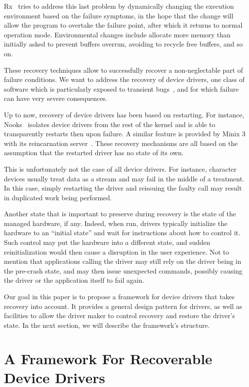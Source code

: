 \documentclass{acm_proc_article-sp}
\begin{document}
Rx~\cite{Qin2007} tries to address this last problem by dynamically changing the execution environment based on the failure symptoms, in the hope that the change will allow the program to overtake the failure point, after which it returns to normal operation mode. Environmental changes include allocate more memory than initially asked to prevent buffers overrun, avoiding to recycle free buffers, and so on.

These recovery techniques allow to successfully recover a non-neglectable part of failure conditions. We want to address the recovery of device drivers, one class of software which is particularly exposed to transient bugs~\cite{Chou2001}, and for which failure can have very severe consequences.

Up to now, recovery of device drivers has been based on restarting. For instance, Nooks~\cite{Swift2003,Swift2006} isolates device drivers from the rest of the kernel and is able to transparently restarts then upon failure. A similar feature is provided by Minix 3 with its reincarnation server~\cite{Herder2007}. These recovery mechanisms are all based on the assumption that the restarted driver has no state of its own.

This is unfortunately not the case of all device drivers. For instance, character devices usually treat data as a stream and may fail in the middle of a treatment. In this case, simply restarting the driver and reissuing the faulty call may result in duplicated work being performed.

Another state that is important to preserve during recovery is the state of the managed hardware, if any. Indeed, when run, drivers typically initialize the hardware to an ``initial state'' and wait for instructions about how to control it. Such control may put the hardware into a different state, and sudden reinitialization would then cause a disruption in the user experience. Not to mention that applications calling the driver may still rely on the driver being in the pre-crash state, and may then issue unexpected commands, possibly causing the driver or the application itself to fail again.

Our goal in this paper is to propose a framework for device drivers that takes recovery into account. It provides a general design pattern for drivers, as well as facilities to allow the driver maker to control recovery and restore the driver's state. In the next section, we will describe the framework's structure.

\section{A Framework For Recoverable Device Drivers}
\label{s:design}
\end{document}
